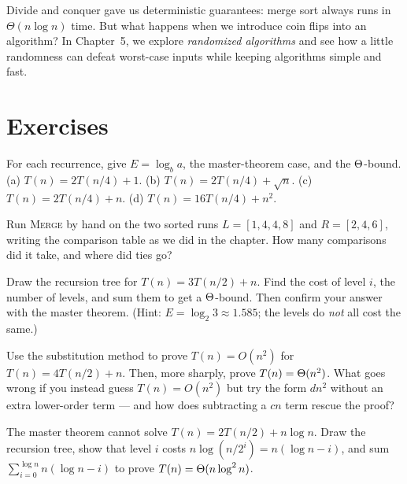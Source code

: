 Divide and conquer gave us deterministic guarantees: merge sort always runs in
$\Theta(n \log n)$ time. But what happens when we introduce coin flips into an
algorithm? In Chapter~5, we explore \emph{randomized algorithms} and see how a
little randomness can defeat worst-case inputs while keeping algorithms simple and
fast.

\section{Exercises}

\begin{exercise}
For each recurrence, give $E=\log_b a$, the master-theorem case, and the
$\Theta$-bound. (a) $T(n)=2T(n/4)+1$. \; (b) $T(n)=2T(n/4)+\sqrt{n}$. \;
(c) $T(n)=2T(n/4)+n$. \; (d) $T(n)=16T(n/4)+n^2$.
\end{exercise}

\begin{exercise}
Run \textsc{Merge} by hand on the two sorted runs $L=[1,4,4,8]$ and $R=[2,4,6]$,
writing the comparison table as we did in the chapter. How many comparisons did it
take, and where did ties go?
\end{exercise}

\begin{exercise}
Draw the recursion tree for $T(n)=3T(n/2)+n$. Find the cost of level $i$, the
number of levels, and sum them to get a $\Theta$-bound. Then confirm your answer with
the master theorem. (Hint: $E=\log_2 3 \approx 1.585$; the levels do \emph{not}
all cost the same.)
\end{exercise}

\begin{exercise}
Use the substitution method to prove $T(n)=O(n^2)$ for $T(n)=4T(n/2)+n$. Then,
more sharply, prove $T(n)=\Theta(n^2)$. What goes wrong if you instead guess
$T(n)=O(n^2)$ but try the form $dn^2$ without an extra lower-order term --- and how
does subtracting a $cn$ term rescue the proof?
\end{exercise}

\begin{exercise}
The master theorem cannot solve $T(n)=2T(n/2)+n\log n$. Draw the recursion tree,
show that level $i$ costs $n\log(n/2^i)=n(\log n - i)$, and sum
$\sum_{i=0}^{\log n} n(\log n - i)$ to prove $T(n)=\Theta(n\log^2 n)$.
\end{exercise}

